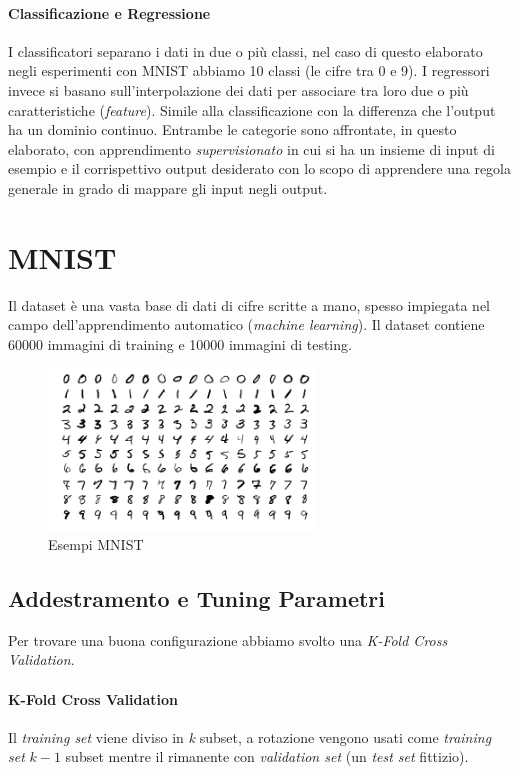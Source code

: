 \documentclass[11pt,a4paper,twoside,
openright]{book}
\begin{document}
\paragraph*{Classificazione e Regressione}
I classificatori separano i dati in due o più classi, nel caso di questo elaborato negli esperimenti con MNIST abbiamo 10 classi (le cifre tra 0 e 9).
I regressori invece si basano sull'interpolazione dei dati per associare tra loro due o più caratteristiche (\textit{feature}). Simile alla classificazione con la differenza che l'output ha un dominio continuo.
Entrambe le categorie sono affrontate, in questo elaborato, con apprendimento \textit{supervisionato} in cui si ha un insieme di input di esempio e il corrispettivo output desiderato con lo scopo di apprendere una regola generale in grado di mappare gli input negli output.

\section{MNIST}
Il dataset è una vasta base di dati di cifre scritte a mano, spesso impiegata nel campo dell'apprendimento automatico (\textit{machine learning}).
Il dataset contiene 60000 immagini di training e 10000 immagini di testing.
\begin{figure}[h!]
\begin{center}
\includegraphics[width=200pt]{MnistExamples.png}
\caption{Esempi MNIST~\cite{pict_mnist}}
\end{center}
\label{fig:mnist}
\end{figure}

\subsection{Addestramento e Tuning Parametri}
Per trovare una buona configurazione abbiamo svolto una \textit{K-Fold Cross Validation}.
\paragraph*{K-Fold Cross Validation}
Il \textit{training set} viene diviso in \textit{k} subset, a rotazione vengono usati come \textit{training set} $k-1$ subset mentre il rimanente con \textit{validation set} (un \textit{test set} fittizio).
\end{document}
